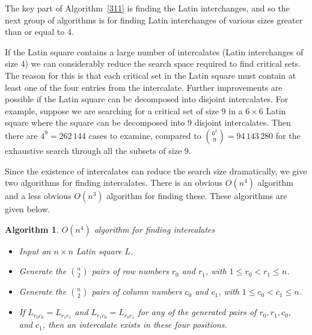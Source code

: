 \documentclass[12pt]{report}
\newtheorem{algorithm}{Algorithm}
\begin{document}
The key part of Algorithm~\ref{311} is finding the Latin interchanges,
and so the next group of algorithms is for finding Latin interchanges
of various sizes greater than or equal to 4.

If the Latin square contains a large number of intercalates (Latin
interchanges of size 4) we can considerably reduce the search space required
to find critical sets.
The reason for this is that each critical set in the Latin square must
contain at least one of the four entries from the intercalate.  Further
improvements are possible if the Latin square can be decomposed into
disjoint intercalates.  For example, suppose we are searching for a
critical set of size 9 in a $6 \times 6$ Latin square where the square
can be decomposed into 9 disjoint intercalates.  Then 
there are $4^9 = 262\,144$ cases to examine, compared to $\displaystyle{\binom{6^2}{9}} =
94\,143\,280$ for the exhaustive search through all the subsets of size 9.

Since the existence of intercalates can reduce the search size
dramatically, we give two algorithms for finding intercalates. 
There is an obvious $O(n^4)$
algorithm and a less obvious $O(n^3)$ algorithm for finding these.
These algorithms are given below.

\begin{algorithm}{$O(n^4)$ algorithm for finding intercalates}
\label{324}
\begin{itemize}
\item Input an $n \times n$ Latin square $L$.  

\item Generate the $\displaystyle{\binom{n}{2}}$ pairs of row numbers $r_{0}$ and $r_{1}$, with
$1 \leq r_{0} < r_{1} \leq n$.

\item Generate the $\displaystyle{\binom{n}{2}}$ pairs of column numbers $c_{0}$ and $c_{1}$, with
$1 \leq c_{0} < c_{1} \leq n$.

\item If $L_{r_{0}c_{0}} = L_{r_{1}c_{1}}$ and 
$L_{r_{1}c_{0}} = L_{r_{0}c_{1}}$ for any
of the generated pairs of $r_{0}, r_{1}, c_{0},$ and $c_{1}$, then an intercalate exists
in these four positions.
\end{itemize}
\end{algorithm}
\end{document}
